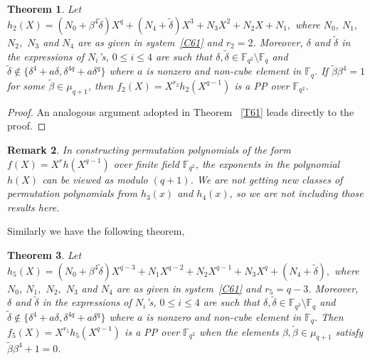 \documentclass[12pt]{amsart}
\newtheorem{thm}{Theorem}[section]
\newtheorem{rmk}[thm]{Remark}
\numberwithin{equation}{section}
\theoremstyle{definition}
\newcommand{\F}{\mathbb F}
\begin{document}
\begin{thm}\label{T66}
 Let $h_2(X)=(N_0 +\beta^4  {\tilde \delta})X^{q}+(N_4+{\tilde \delta})X^3 +N_3X^2+ N_2X+ N_1,$ where $N_0$, $N_1,$ $N_2,$ $N_3$ and $N_4$ are as given in system~\eqref{C61} and $r_2=2$. Moreover, $\delta$ and $\tilde \delta$ in the expressions of $N_i$'s, $0 \leq i \leq 4$ are such that $\delta, \tilde \delta \in \F_{q^2}\setminus\F_{q}$ and $\tilde \delta \not \in \{ \delta^4+a \delta, \delta^{4q}+a \delta^q\}$ where $a$ is nonzero and non-cube element in $\F_q$. If ${\tilde \beta}\beta^4=1$ for some ${\tilde \beta} \in \mu_{q+1}$, then $f_2(X)=X^{r_2}h_2(X^{q-1})$ is a PP over $\F_{q^2}$.
\end{thm}

\begin{proof}
An analogous argument adopted in Theorem ~\ref{T61} leads directly to the proof.
\end{proof}


\begin{rmk}
 In constructing permutation polynomials of the form $f(X)=X^rh(X^{q-1})$ over finite field $\F_{q^2}$, the exponents in the polynomial $h(X)$ can be viewed as modulo $(q+1)$.
%
 We are not getting new classes of permutation polynomials from $h_3(x)$ and $h_4(x)$, so we are not including  those results here.
\end{rmk}

Similarly we have the following theorem, 
\begin{thm}\label{T69}
 Let $h_5(X) = (N_0 + \beta^4{\tilde \delta})X^{q-3}+N_1X^{q-2}+N_2X^{q-1}+N_3X^q+(N_4+{\tilde \delta}),$ where $N_0$, $N_1,$ $N_2,$ $N_3$ and $N_4$ are as given in system~\eqref{C61} and $r_5=q-3$. Moreover, $\delta$ and $\tilde \delta$ in the expressions of $N_i$'s, $0 \leq i \leq 4$ are such that $\delta, \tilde \delta \in \F_{q^2}\setminus\F_{q}$ and $\tilde \delta \not \in \{ \delta^4+a \delta, \delta^{4q}+a \delta^q\}$ where $a$ is nonzero and non-cube element in $\F_q$. Then $f_5(X)=X^{r_5}h_5(X^{q-1})$ is a PP over $\F_{q^2}$ when the elements $\beta, \tilde{\beta} \in \mu_{q+1}$ satisfy ${\tilde \beta}\beta^4+1=0$.
\end{thm}
\end{document}
